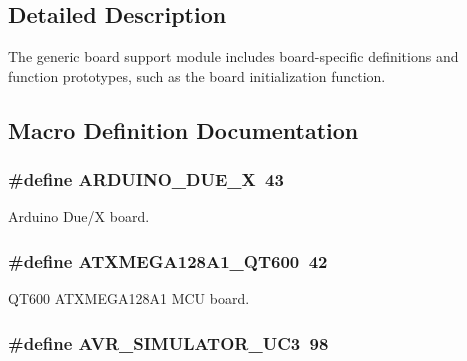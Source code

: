 \subsection{Detailed Description}
The generic board support module includes board-\/specific definitions and function prototypes, such as the board initialization function. 

\subsection{Macro Definition Documentation}
\hypertarget{group__group__common__boards_gaada45a3e41c9f2ecf1332b408e9903ec}{
\subsubsection[{A\-R\-D\-U\-I\-N\-O\-\_\-\-D\-U\-E\-\_\-\-X}]{\setlength{\rightskip}{0pt plus 5cm}\#define A\-R\-D\-U\-I\-N\-O\-\_\-\-D\-U\-E\-\_\-\-X~43}}\label{group__group__common__boards_gaada45a3e41c9f2ecf1332b408e9903ec}


Arduino Due/\-X board. 

\hypertarget{group__group__common__boards_ga71c98fe89b8fdd9d764fe26eecb06d2d}{
\subsubsection[{A\-T\-X\-M\-E\-G\-A128\-A1\-\_\-\-Q\-T600}]{\setlength{\rightskip}{0pt plus 5cm}\#define A\-T\-X\-M\-E\-G\-A128\-A1\-\_\-\-Q\-T600~42}}\label{group__group__common__boards_ga71c98fe89b8fdd9d764fe26eecb06d2d}


Q\-T600 A\-T\-X\-M\-E\-G\-A128\-A1 M\-C\-U board. 

\hypertarget{group__group__common__boards_gad93cf08d9dfb95c3c2cfd1cf38c0f2e4}{
\subsubsection[{A\-V\-R\-\_\-\-S\-I\-M\-U\-L\-A\-T\-O\-R\-\_\-\-U\-C3}]{\setlength{\rightskip}{0pt plus 5cm}\#define A\-V\-R\-\_\-\-S\-I\-M\-U\-L\-A\-T\-O\-R\-\_\-\-U\-C3~98}}\label{group__group__common__boards_gad93cf08d9dfb95c3c2cfd1cf38c0f2e4}


